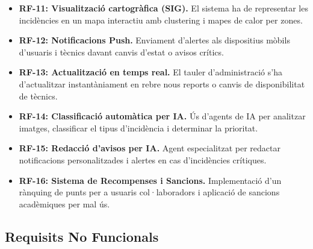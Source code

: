 \begin{itemize}
	\item \textbf{RF-11: Visualització cartogràfica (SIG).} 
	El sistema ha de representar les incidències en un mapa interactiu amb clustering i mapes de calor per zones.
	
	\item \textbf{RF-12: Notificacions Push. }
	Enviament d'alertes als dispositius mòbils d'usuaris i tècnics davant canvis d'estat o avisos crítics. 
	
	\item \textbf{RF-13: Actualització en temps real.} 
	El tauler d'administració s'ha d'actualitzar instantàniament en rebre nous reports o canvis de disponibilitat de tècnics. 
	
	\item \textbf{RF-14: Classificació automàtica per IA. }
	Ús d'agents de IA per analitzar imatges, classificar el tipus d'incidència i determinar la prioritat. 
	
	\item \textbf{RF-15: Redacció d'avisos per IA. }
	Agent especialitzat per redactar notificacions personalitzades i alertes en cas d'incidències crítiques. 
	
	\item \textbf{RF-16: Sistema de Recompenses i Sancions. }
	Implementació d'un rànquing de punts per a usuaris col·laboradors i aplicació de sancions acadèmiques per mal ús.
	
\end{itemize}

\subsection{Requisits No Funcionals}

